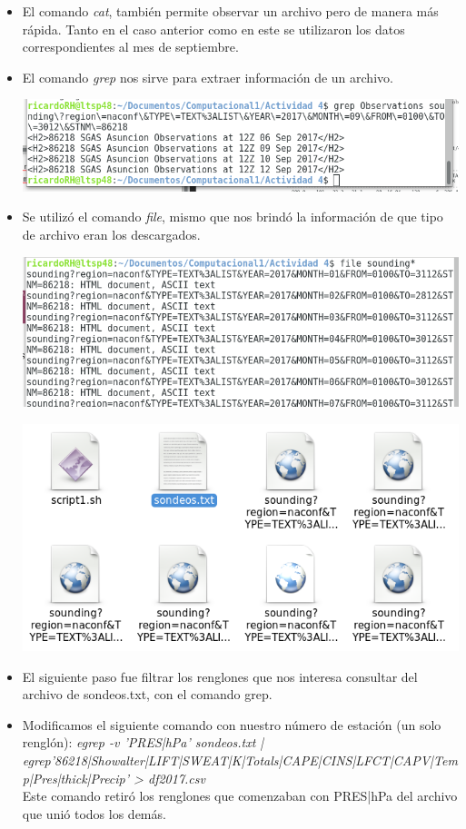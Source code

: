 \documentclass{article}
\begin{document}
\begin{doublespace}
\begin{itemize}
\item El comando \textit{cat}, también permite observar un archivo pero de manera más rápida. Tanto en el caso anterior como en este se utilizaron los datos correspondientes al mes de septiembre.

\pagebreak
\item El comando \textit{grep} nos sirve para extraer información de un archivo. 
\\
\begin{center}
\includegraphics[scale=0.5]{act46.png}
\end{center}

\item Se utilizó el comando \textit{file}, mismo que nos brindó la información de que tipo de archivo eran los descargados.
\begin{center}
\includegraphics[scale=0.5]{act47.png}
\end{center}

\begin{center}
\includegraphics[scale=0.5]{act48.png}
\end{center}
\item El siguiente paso fue filtrar los renglones que nos interesa consultar del archivo de sondeos.txt, con el comando grep.
\item Modificamos el siguiente comando con nuestro número de estación (un solo renglón): 
\textit{egrep -v 'PRES|hPa' sondeos.txt | egrep'86218|Showalter|LIFT|SWEAT|K|Totals|CAPE|CINS|LFCT|CAPV|Temp|Pres|thick|Precip' > df2017.csv} 
\\
Este comando retiró los renglones que comenzaban con PRES|hPa del archivo que unió todos los demás.


\end{itemize}
\end{doublespace}
\end{document}
